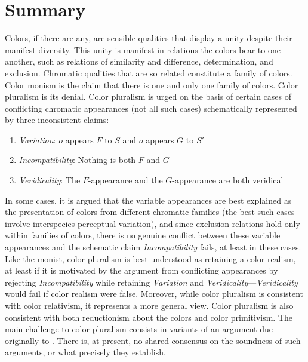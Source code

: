 \documentclass[12pt]{article}
\begin{document}

\section{Summary} %
\label{sec:summary}

Colors, if there are any, are sensible qualities that display a unity despite their manifest diversity. This unity is manifest in relations the colors bear to one another, such as relations of similarity and difference, determination, and exclusion. Chromatic qualities that are so related constitute a family of colors. Color monism is the claim that there is one and only one family of colors. Color pluralism is its denial. Color pluralism is urged on the basis of certain cases of conflicting chromatic appearances (not all such cases) schematically represented by three inconsistent claims: 
\begin{enumerate}
	\item \emph{Variation}: \( o \) appears \( F \) to \( S \) and \( o \) appears \( G \) to \( S' \)
	\item \emph{Incompatibility}: Nothing is both \( F \) and \( G \)
	\item \emph{Veridicality}: The \( F \)-appearance and the \( G \)-appearance are both veridical
\end{enumerate}
In some cases, it is argued that the variable appearances are best explained as the presentation of colors from different chromatic families (the best such cases involve interspecies perceptual variation), and since exclusion relations hold only within families of colors, there is no genuine conflict between these variable appearances and the schematic claim \emph{Incompatibility} fails, at least in these cases. Like the monist, color pluralism is best understood as retaining a color realism, at least if it is motivated by the argument from conflicting appearances by rejecting \emph{Incompatibility} while retaining \emph{Variation} and \emph{Veridicality}---\emph{Veridicality} would fail if color realism were false. Moreover, while color pluralism is consistent with color relativism, it represents a more general view. Color pluralism is also consistent with both reductionism about the colors and color primitivism. The main challenge to color pluralism consists in variants of an argument due originally to \citet{Shoemaker:2003wk}. There is, at present, no shared consensus on the soundness of such arguments, or what precisely they establish.



\nocite{Cooper:1997fk}
\nocite{Hett:1936fk}
\nocite{Heraclitus:1979uq}

 
 
\end{document}
